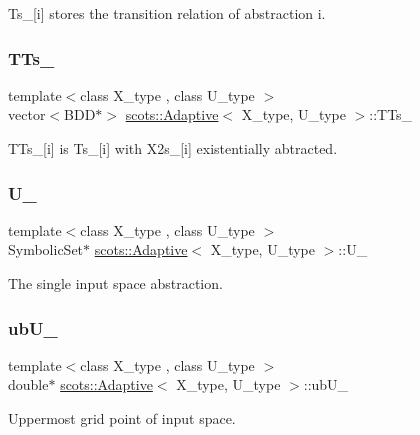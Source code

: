 Ts\+\_\+\mbox{[}i\mbox{]} stores the transition relation of abstraction i. \mbox{\label{classscots_1_1Adaptive_a1f4c02094ecd380887640c83fc1d0310}} 
\subsubsection{\texorpdfstring{T\+Ts\+\_\+}{TTs\_}}
{\footnotesize\ttfamily template$<$class X\+\_\+type , class U\+\_\+type $>$ \\
vector$<$B\+DD$\ast$$>$ \hyperlink{classscots_1_1Adaptive}{scots\+::\+Adaptive}$<$ X\+\_\+type, U\+\_\+type $>$\+::T\+Ts\+\_\+}

T\+Ts\+\_\+\mbox{[}i\mbox{]} is Ts\+\_\+\mbox{[}i\mbox{]} with X2s\+\_\+\mbox{[}i\mbox{]} existentially abtracted. \mbox{\label{classscots_1_1Adaptive_a89fa563cfea5b9a7bec6a705ca412a18}} 
\subsubsection{\texorpdfstring{U\+\_\+}{U\_}}
{\footnotesize\ttfamily template$<$class X\+\_\+type , class U\+\_\+type $>$ \\
Symbolic\+Set$\ast$ \hyperlink{classscots_1_1Adaptive}{scots\+::\+Adaptive}$<$ X\+\_\+type, U\+\_\+type $>$\+::U\+\_\+}

The single input space abstraction. \mbox{\label{classscots_1_1Adaptive_aa5c0bc8b175609073aa1f26ad6a83f1c}} 
\subsubsection{\texorpdfstring{ub\+U\+\_\+}{ubU\_}}
{\footnotesize\ttfamily template$<$class X\+\_\+type , class U\+\_\+type $>$ \\
double$\ast$ \hyperlink{classscots_1_1Adaptive}{scots\+::\+Adaptive}$<$ X\+\_\+type, U\+\_\+type $>$\+::ub\+U\+\_\+}

Uppermost grid point of input space. \mbox{\label{classscots_1_1Adaptive_ac50c58c4495d727acdb321a0b995426b}} 
